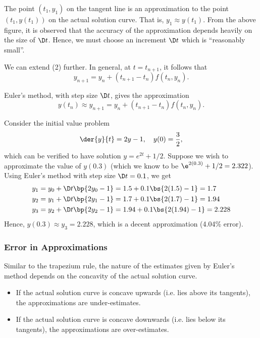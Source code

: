 The point $(t_1, y_1)$ on the tangent line is an approximation to the point $(t_1, y(t_1))$ on the actual solution curve. That is, $y_1 \approx y(t_1)$. From the above figure, it is observed that the accuracy of the approximation depends heavily on the size of $\D t$. Hence, we must choose an increment $\D t$ which is ``reasonably small''.

We can extend (2) further. In general, at $t = t_{n+1}$, it follows that \[y_{n+1} = y_n + (t_{n+1} - t_n) f(t_n, y_n).\]

\begin{recipe}
    Euler's method, with step size $\D t$, gives the approximation \[y(t_n) \approx y_{n+1} = y_n + (t_{n+1} - t_n) f(t_n, y_n).\]
\end{recipe}

\begin{example}\label{eg:Eulers-Method}
    Consider the initial value problem \[\der{y}{t} = 2y - 1, \quad y(0) = \frac32,\] which can be verified to have solution $y = e^{2t} + 1/2$. Suppose we wish to approximate the value of $y(0.3)$ (which we know to be $\e^{2(0.3)} + 1/2 = 2.322$). Using Euler's method with step size $\D t = 0.1$, we get
    \begin{align*}
        y_1 &= y_0 + \D t \bp{2y_0 - 1} = 1.5 + 0.1 \bs{2(1.5) - 1} = 1.7\\
        y_2 &= y_1 + \D t \bp{2y_1 - 1} = 1.7 + 0.1 \bs{2(1.7) - 1} = 1.94\\
        y_3 &= y_2 + \D t \bp{2y_2 - 1} = 1.94 + 0.1 \bs{2(1.94) - 1} = 2.228
    \end{align*}
    Hence, $y(0.3) \approx y_3 = 2.228$, which is a decent approximation (4.04\% error).
\end{example}

\subsubsection{Error in Approximations}

Similar to the trapezium rule, the nature of the estimates given by Euler's method depends on the concavity of the actual solution curve.
\begin{itemize}
    \item If the actual solution curve is concave upwards (i.e. lies above its tangents), the approximations are under-estimates.
    \item If the actual solution curve is concave downwards (i.e. lies below its tangents), the approximations are over-estimates.
\end{itemize}

